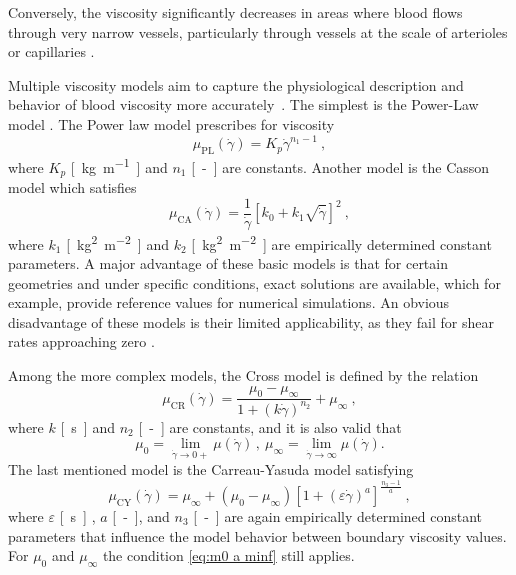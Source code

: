 Conversely, the viscosity significantly decreases in areas where blood flows through very narrow vessels, particularly through vessels at the scale of arterioles or capillaries \cite{Saloner2019}.

Multiple viscosity models aim to capture the physiological description and behavior of blood viscosity more accurately~\cite{Saloner2019, Eichler2023, Boyd2007}. The simplest is the Power-Law model \cite{Sequeira}. The Power law model prescribes for viscosity
\begin{equation}\label{eq:power-law}
	\mu _{\text{PL}} (\dot{\gamma}) = K_p  \dot{\gamma} ^{n_1-1} \ ,
\end{equation}
where $ K_p$ \si{[kg.m^{-1}]} and $ n_1 $ \si{[-]} are constants. Another model is the Casson model \cite{Boyd2007} which satisfies
\begin{equation}\label{eq:Casson}
	\mu _{\text{CA}} (\dot{\gamma}) = \frac{1}{\dot{\gamma}} \left[ k_{0} + k_{1} \sqrt{\dot{\gamma}} \right]^2 \ ,
\end{equation}
where $ k_1$ \si{[kg^{2}.m^{-2}]} and $ k_2 $ \si{[kg^{2}.m^{-2}]} are empirically determined constant parameters. A major advantage of these basic models is that for certain geometries and under specific conditions, exact solutions are available, which for example, provide reference values for numerical simulations. An obvious disadvantage of these models is their limited applicability, as they fail for shear rates approaching zero \cite{Boyd2007}.

Among the more complex models, the Cross model \cite{Sequeira} is defined by the relation
\begin{equation}\label{eq:cross}
	\mu _{\text{CR}} (\dot{\gamma}) = \frac{\mu_{0} - \mu_{\infty}}{1 + (k\dot{\gamma})^{n_2}} + \mu_{\infty}  \ ,
\end{equation}
where $ k $ \si{[s]} and $ n_2 $ \si{[-]} are constants, and it is also valid that
\begin{equation}\label{eq:m0 a minf}
	\mu _{0}  = \lim_{\dot{\gamma} \rightarrow 0+}\mu (\dot{\gamma})\, , \ \mu_{\infty} = \lim_{\dot{\gamma} \rightarrow \infty}\mu (\dot{\gamma}).
\end{equation}
The last mentioned model is the Carreau-Yasuda model \cite{Boyd2007} satisfying
\begin{equation}\label{eq:C-Y}
	\mu _{\text{CY}} (\dot{\gamma}) = \mu_{\infty} + (\mu_{0} - \mu_{\infty}) \left[ 1 + (\varepsilon \dot{\gamma}) ^{a} \right]^{\frac{n_3-1}{a}} \ ,
\end{equation}
where $ \varepsilon$ \si{[s]} , $a$ \si{[-]}, and $ n_3 $ \si{[-]} are again empirically determined constant parameters that influence the model behavior between boundary viscosity values. For $ \mu_{0}$ and $ \mu_{\infty} $ the condition \eqref{eq:m0 a minf} still applies.

